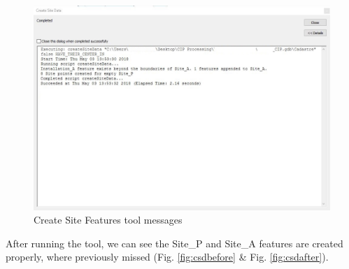 \documentclass[openany]{book}
\theoremstyle{definition}
\theoremstyle{definition}
\theoremstyle{definition}
\theoremstyle{remark}
\begin{document}
\begin{figure}[H]

{\centering \includegraphics[width=5.07in,]{figures/csd-messages} 

}

\caption{Create Site Features tool messages}\label{fig:csdmessages}
\end{figure}

After running the tool, we can see the Site\_P and Site\_A features are
created properly, where previously missed (Fig. \ref{fig:csdbefore} \&
Fig. \ref{fig:csdafter}).
\end{document}
